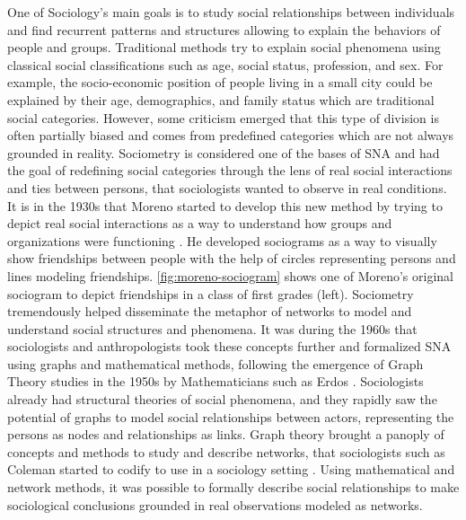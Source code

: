 One of Sociology's main goals is to study social relationships between individuals and find recurrent patterns and structures allowing to explain the behaviors of people and groups.
Traditional methods try to explain social phenomena using classical social classifications such as age, social status, profession, and sex.
For example, the socio-economic position of people living in a small city could be explained by their age, demographics, and family status which are traditional social categories.
However, some criticism emerged that this type of division is often partially biased and comes from predefined categories which are not always grounded in reality.
Sociometry is considered one of the bases of SNA and had the goal of redefining social categories through the lens of real social interactions and ties between persons, that sociologists wanted to observe in real conditions.
It is in the 1930s that Moreno started to develop this new method by trying to depict real social interactions as a way to understand how groups and organizations were functioning \cite{morenoFoundationsSociometryIntroduction1941}.
He developed sociograms as a way to visually show friendships between people with the help of circles representing persons and lines modeling friendships.
\autoref{fig:moreno-sociogram} shows one of Moreno's original sociogram to depict friendships in a class of first grades (left).
Sociometry tremendously helped disseminate the metaphor of networks to model and understand social structures and phenomena.
It was during the 1960s that sociologists and anthropologists took these concepts further and formalized SNA using graphs and mathematical methods, following the emergence of Graph Theory studies in the 1950s by Mathematicians such as Erdos \cite{erdos2011}.
Sociologists already had structural theories of social phenomena, and they rapidly saw the potential of graphs to model social relationships between actors, representing the persons as nodes and relationships as links.
Graph theory brought a panoply of concepts and methods to study and describe networks, that sociologists such as Coleman started to codify to use in a sociology setting \cite{colemanIntroductionMathematicalSociology1964}.
Using mathematical and network methods, it was possible to formally describe social relationships to make sociological conclusions grounded in real observations modeled as networks.


